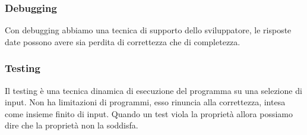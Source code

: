 \subsubsection{Debugging}
Con debugging abbiamo una tecnica di supporto dello sviluppatore, le risposte date possono 
avere sia perdita di correttezza che di completezza.
\subsubsection{Testing}
Il testing è una tecnica dinamica di esecuzione del programma su una selezione di input.
Non ha limitazioni di programmi, esso rinuncia alla correttezza, intesa come insieme finito di input. 
Quando un test viola la proprietà allora possiamo dire che la proprietà non la soddisfa. 